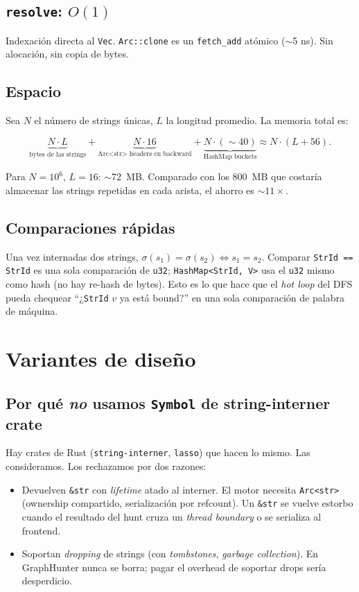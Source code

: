 \subsection{\texttt{resolve}: \(O(1)\)}

Indexación directa al \texttt{Vec}. \texttt{Arc::clone} es un
\texttt{fetch\_add} atómico ($\sim$5 ns). Sin alocación, sin
copia de bytes.

\subsection{Espacio}

Sea \(N\) el número de strings únicas, \(L\) la longitud promedio.
La memoria total es:

\[
\underbrace{N \cdot L}_{\text{bytes de las strings}} +
\underbrace{N \cdot 16}_{\text{Arc<str> headers en backward}} +
\underbrace{N \cdot (\sim 40)}_{\text{HashMap buckets}}
\approx N \cdot (L + 56).
\]

Para \(N = 10^6\), \(L = 16\): \(\sim 72\)~MB. Comparado con los
\(800\)~MB que costaría almacenar las strings repetidas en cada
arista, el ahorro es \(\sim 11\times\).

\subsection{Comparaciones rápidas}

Una vez internadas dos strings, \(\sigma(s_1) = \sigma(s_2) \iff
s_1 = s_2\). Comparar \texttt{StrId == StrId} es una sola
comparación de \texttt{u32}; \texttt{HashMap<StrId, V>} usa el
\texttt{u32} mismo como hash (no hay re-hash de bytes). Esto es lo
que hace que el \emph{hot loop} del DFS pueda chequear
``¿\texttt{StrId} \(v\) ya está bound?'' en una sola comparación
de palabra de máquina.

\section{Variantes de diseño}

\subsection{Por qué \emph{no} usamos \texttt{Symbol} de string-interner crate}

Hay crates de Rust (\texttt{string-interner},
\texttt{lasso}) que hacen lo mismo. Las consideramos. Los rechazamos
por dos razones:

\begin{itemize}
    \item Devuelven \texttt{\&str} con \emph{lifetime} atado al
    interner. El motor necesita \texttt{Arc<str>} (ownership compartido,
    serialización por refcount). Un \texttt{\&str} se vuelve estorbo
    cuando el resultado del hunt cruza un \emph{thread boundary} o
    se serializa al frontend.
    \item Soportan \emph{dropping} de strings (con
    \emph{tombstones}, \emph{garbage collection}). En GraphHunter
    nunca se borra; pagar el overhead de soportar drops sería
    desperdicio.
\end{itemize}

